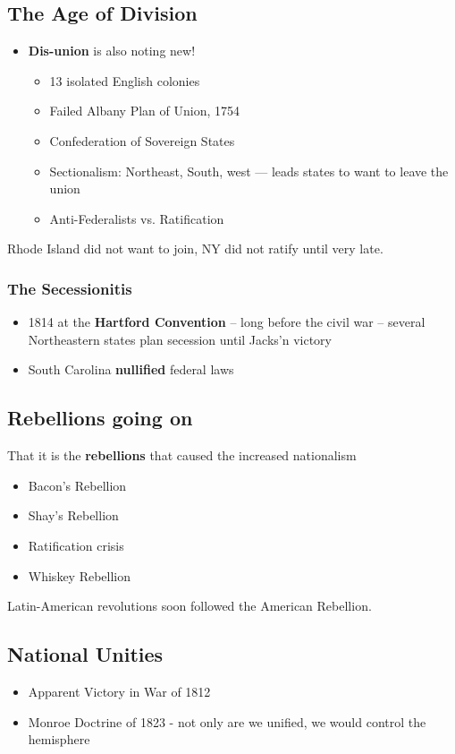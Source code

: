 \documentclass[11pt]{article}
\begin{document}
\subsection{The Age of Division}
\label{sec:orgc021153}
\begin{itemize}
\item \textbf{\textbf{Dis-union}} is also noting new!
\begin{itemize}
\item 13 isolated English colonies
\item Failed Albany Plan of Union, 1754
\item Confederation of Sovereign States
\item Sectionalism: Northeast, South, west --- leads states to want to leave the union
\item Anti-Federalists vs. Ratification
\end{itemize}
\end{itemize}

Rhode Island did not want to join, NY did not ratify until very late.

\subsubsection{The Secessionitis}
\label{sec:org58bb390}
\begin{itemize}
\item 1814 at the \textbf{\textbf{Hartford Convention}} -- long before the civil war -- several Northeastern states plan secession until Jacks'n victory
\item South Carolina \textbf{\textbf{nullified}} federal laws
\end{itemize}


\subsection{Rebellions going on}
\label{sec:orgc5b2085}
That it is the \textbf{\textbf{rebellions}} that caused the increased nationalism

\begin{itemize}
\item Bacon's Rebellion
\item Shay's Rebellion
\item Ratification crisis
\item Whiskey Rebellion
\end{itemize}

Latin-American revolutions soon followed the American Rebellion. 

\subsection{National Unities}
\label{sec:org7057aea}
\begin{itemize}
\item Apparent Victory in War of 1812
\item Monroe Doctrine of 1823 - not only are we unified, we would control the hemisphere
\end{itemize}
\end{document}
